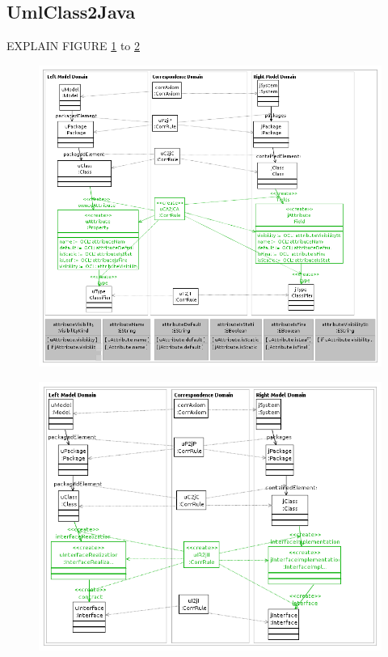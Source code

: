 \documentclass[tuberlin,cic,tc,english,noabntcite]{iiufrgs}
\begin{document}
\subsection{UmlClass2Java}
EXPLAIN FIGURE \ref{fig:uCAttribute2jCAttribute} to \ref{fig:uIRealization2jIImplementation}

\begin{figure}[h]
    \caption{}
    \begin{center}
        \includegraphics[width=40em]{uCAttribute2jCAttribute}
    \end{center}
    \label{fig:uCAttribute2jCAttribute}
\end{figure}
\begin{figure}[h]
    \caption{}
    \begin{center}
        \includegraphics[width=40em]{uIRealization2jIImplementation}
    \end{center}
    \label{fig:uIRealization2jIImplementation}
\end{figure}
\end{document}
